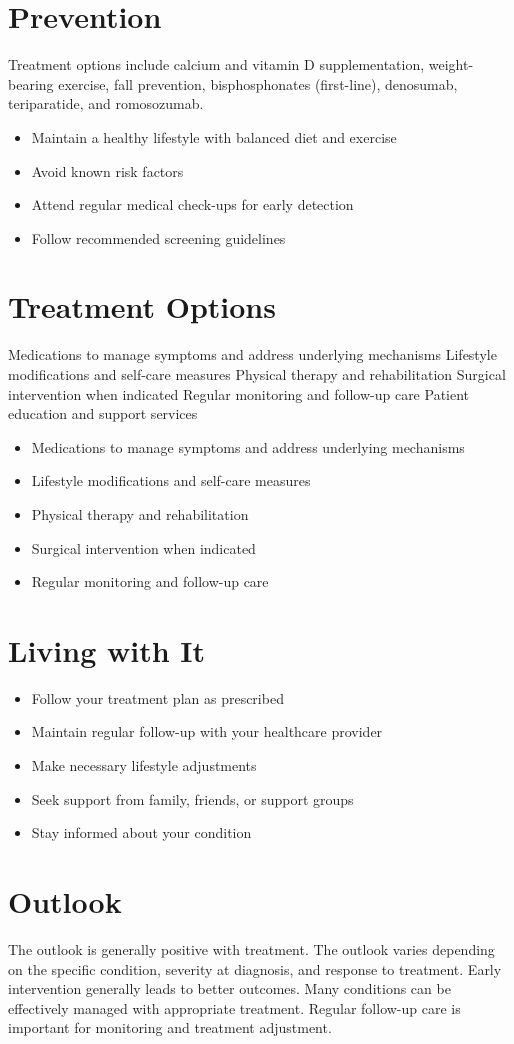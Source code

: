\section{Prevention}
Treatment options include calcium and vitamin D supplementation, weight-bearing exercise, fall prevention, bisphosphonates (first-line), denosumab, teriparatide, and romosozumab.

\begin{itemize}[noitemsep]
  \item Maintain a healthy lifestyle with balanced diet and exercise
  \item Avoid known risk factors
  \item Attend regular medical check-ups for early detection
  \item Follow recommended screening guidelines
\end{itemize}
\section{Treatment Options}
Medications to manage symptoms and address underlying mechanisms Lifestyle modifications and self-care measures Physical therapy and rehabilitation Surgical intervention when indicated Regular monitoring and follow-up care Patient education and support services

\begin{itemize}[noitemsep]
  \item Medications to manage symptoms and address underlying mechanisms
  \item Lifestyle modifications and self-care measures
  \item Physical therapy and rehabilitation
  \item Surgical intervention when indicated
  \item Regular monitoring and follow-up care
\end{itemize}
\section{Living with It}
\begin{itemize}[noitemsep]
  \item Follow your treatment plan as prescribed
  \item Maintain regular follow-up with your healthcare provider
  \item Make necessary lifestyle adjustments
  \item Seek support from family, friends, or support groups
  \item Stay informed about your condition
\end{itemize}
\section{Outlook}
The outlook is generally positive with treatment. The outlook varies depending on the specific condition, severity at diagnosis, and response to treatment. Early intervention generally leads to better outcomes. Many conditions can be effectively managed with appropriate treatment. Regular follow-up care is important for monitoring and treatment adjustment.
